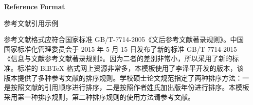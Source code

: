 


\begin{raggedright}{\bfseries{}\hspace{0.5em}Reference Format} \vspace{9pt} \end{raggedright}

参考文献引用示例


参考文献格式应符合国家标准 GB/T-7714-2005《文后参考文献著录规则》。中国国家标准化管理委员会于 2015 年 5 月 15 日发布了新的标准 GB/T 7714-2015《信息与文献参考文献著录规则》。因为二者的差别非常小，所以采用了新的标准。标准的 BiBTeX 格式网上资源非常多，本模板使用了李泽平开发的版本，该版本提供了多种参考文献的排序规则。学校硕士论文规范指定了两种排序方法：一是按照文献的引用顺序进行排序，二是按照作者姓氏加出版年份进行排序。本模板采用第一种排序规则，第二种排序规则的使用方法请参考文献\cite{Lee2016}。



\clearpage


